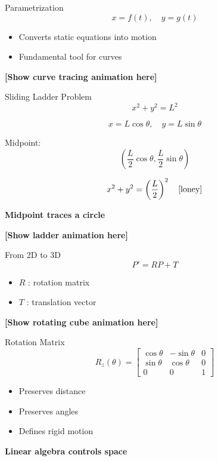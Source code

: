 \documentclass{beamer}
\begin{document}
\begin{frame}{Parametrization}
\[
x = f(t), \quad y = g(t)
\]

\begin{itemize}
\item Converts static equations into motion \cite{loney}
\item Fundamental tool for curves
\end{itemize}

\vspace{0.3cm}
\textbf{[Show curve tracing animation here]} \cite{matplotlib}
\end{frame}

\begin{frame}{Sliding Ladder Problem}
\[
x^2 + y^2 = L^2
\]

\[
x = L\cos\theta, \quad y = L\sin\theta
\]

Midpoint:
\[
\left(\frac{L}{2}\cos\theta, \frac{L}{2}\sin\theta \right)
\]

\[
x^2 + y^2 = \left(\frac{L}{2}\right)^2 \quad \cite{loney}
\]

\centering
\textbf{Midpoint traces a circle}

\vspace{0.3cm}
\textbf{[Show ladder animation here]}
\end{frame}

\begin{frame}{From 2D to 3D}
\[
P' = RP + T
\]

\begin{itemize}
\item $R$ : rotation matrix
\item $T$ : translation vector
\end{itemize}

\vspace{0.3cm}
\textbf{[Show rotating cube animation here]} \cite{friedberg}
\end{frame}

\begin{frame}{Rotation Matrix}
\[
R_z(\theta) =
\begin{bmatrix}
\cos\theta & -\sin\theta & 0 \\
\sin\theta & \cos\theta & 0 \\
0 & 0 & 1
\end{bmatrix}
\]

\begin{itemize}
\item Preserves distance
\item Preserves angles
\item Defines rigid motion \cite{friedberg}
\end{itemize}

\centering
\textbf{Linear algebra controls space}
\end{frame}
\end{document}
